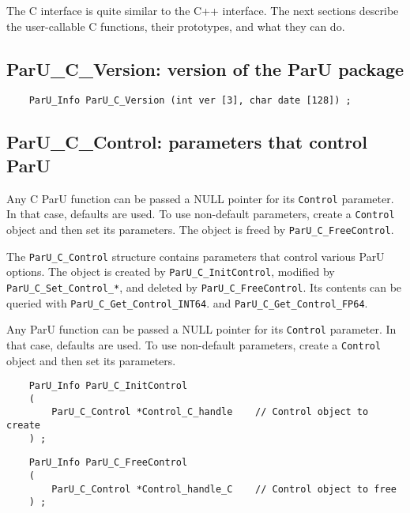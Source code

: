 \documentclass[12pt]{article}
\begin{document}
The C interface is quite similar to the C++ interface.  The next sections
describe the user-callable C functions, their prototypes, and what they can do.

\subsection{{\sf ParU\_C\_Version}: version of the ParU package}

    {\footnotesize
    \begin{verbatim}
    ParU_Info ParU_C_Version (int ver [3], char date [128]) ; \end{verbatim} }

\subsection{{\sf ParU\_C\_Control}: parameters that control ParU}

    Any C ParU function can be passed a NULL pointer for its \verb'Control'
    parameter.  In that case, defaults are used.  To use non-default
    parameters, create a \verb'Control' object and then set its parameters.
    The object is freed by \verb'ParU_C_FreeControl'.

    The \verb'ParU_C_Control' structure contains parameters that control
    various ParU options.  The object is created by \verb'ParU_C_InitControl',
    modified by \verb'ParU_C_Set_Control_*', and deleted by
    \verb'ParU_C_FreeControl'.  Its contents can be queried with
    \verb'ParU_C_Get_Control_INT64'.  and \verb'ParU_C_Get_Control_FP64'.

    Any ParU function can be passed a NULL pointer for its \verb'Control'
    parameter.  In that case, defaults are used.  To use non-default
    parameters, create a \verb'Control' object and then set its parameters.

    {\footnotesize
    \begin{verbatim}
    ParU_Info ParU_C_InitControl
    (
        ParU_C_Control *Control_C_handle    // Control object to create
    ) ; \end{verbatim} }

    {\footnotesize
    \begin{verbatim}
    ParU_Info ParU_C_FreeControl
    (
        ParU_C_Control *Control_handle_C    // Control object to free
    ) ; \end{verbatim} }
\end{document}
